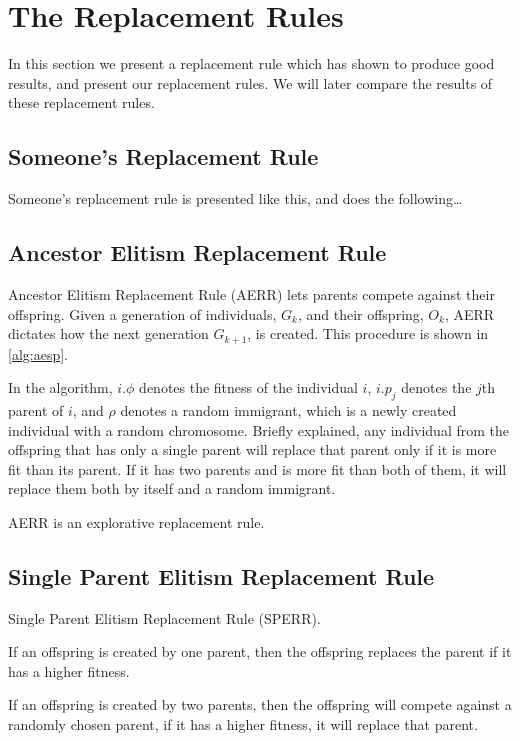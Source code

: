 \section{The Replacement Rules}
In this section we present a replacement rule which has shown to produce good results, and present our replacement rules. We will later compare the results of these replacement rules.

\subsection{Someone's Replacement Rule}

Someone's replacement rule is presented like this, and does the following\dots

\subsection{Ancestor Elitism Replacement Rule}

Ancestor Elitism Replacement Rule (AERR) lets parents compete against their offspring. Given a generation of individuals, $G_k$, and their offspring, $O_k$, AERR dictates how the next generation $G_{k+1}$, is created. This procedure is shown in \cref{alg:aesp}.
%

%
In the algorithm, $i.\phi$ denotes the fitness of the individual $i$, $i.p_j$ denotes the $j$th parent of $i$, and $\rho$ denotes a random immigrant, which is a newly created individual with a random chromosome.
Briefly explained, any individual from the offspring that has only a single parent will replace that parent only if it is more fit than its parent. If it has two parents and is more fit than both of them, it will replace them both by itself and a random immigrant.

AERR is an explorative replacement rule.

\subsection{Single Parent Elitism Replacement Rule}

Single Parent Elitism Replacement Rule (SPERR). 

If an offspring is created by one parent, then the offspring replaces the parent if it has a higher fitness. 

If an offspring is created by two parents, then the offspring will compete against a randomly chosen parent, if it has a higher fitness, it will replace that parent.


